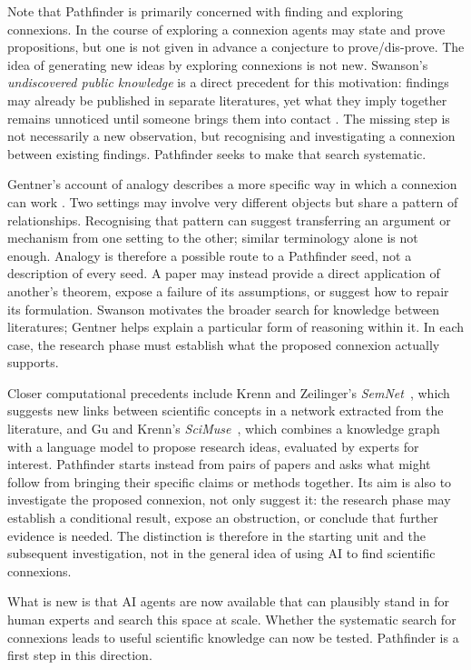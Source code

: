\documentclass[11pt,a4paper]{article}
\begin{document}
Note that Pathfinder is primarily concerned with finding and exploring connexions. In the
course of exploring a connexion agents may state and prove propositions, but one is not
given in advance a conjecture to prove/dis-prove. The idea of generating new
ideas by exploring connexions is not new. Swanson's \emph{undiscovered public
knowledge} is a direct precedent for this motivation: findings may already be
published in separate literatures, yet what they imply together remains
unnoticed until someone brings them into contact \cite{swanson1986}. The
missing step is not necessarily a new observation, but recognising and
investigating a connexion between existing findings. Pathfinder seeks to make
that search systematic.

Gentner's account of analogy describes a more specific way in which a
connexion can work \cite{gentner1983}. Two settings may involve very different
objects but share a pattern of relationships. Recognising that pattern can
suggest transferring an argument or mechanism from one setting to the other;
similar terminology alone is not enough. Analogy is therefore a possible
route to a Pathfinder seed, not a description of every seed. A paper may
instead provide a direct application of another's theorem, expose a failure
of its assumptions, or suggest how to repair its formulation. Swanson
motivates the broader search for knowledge between literatures; Gentner helps
explain a particular form of reasoning within it. In each case, the research
phase must establish what the proposed connexion actually supports.

Closer computational precedents include Krenn and Zeilinger's
\emph{SemNet}~\cite{krenn2020semnet}, which suggests new links between
scientific concepts in a network extracted from the literature, and Gu and
Krenn's \emph{SciMuse}~\cite{gu2025scimuse}, which combines a knowledge graph
with a language model to propose research ideas, evaluated by experts for
interest. Pathfinder starts instead from pairs of papers and asks what might
follow from bringing their specific claims or methods together. Its aim is
also to investigate the proposed connexion, not only suggest it: the research
phase may establish a conditional result, expose an obstruction, or conclude
that further evidence is needed. The distinction is therefore in the starting
unit and the subsequent investigation, not in the general idea of using AI
to find scientific connexions.

What is new is that AI agents
are now available that can plausibly stand in for human experts and search this
space at scale. Whether the systematic search for connexions leads to useful
scientific knowledge can now be tested. Pathfinder is a first step in this
direction.
\end{document}
